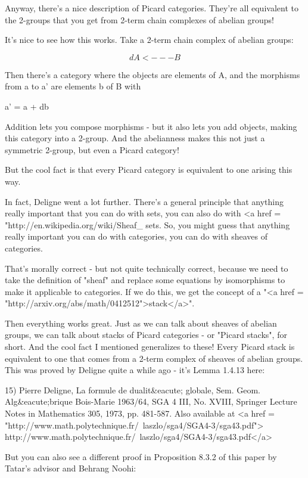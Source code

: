 Anyway, there's a nice description of Picard categories.  They're all
equivalent to the 2-groups that you get from 2-term chain complexes of
abelian groups!

It's nice to see how this works.  Take a 2-term chain complex of
abelian groups:

$$
    d
A <--- B
$$
    

Then there's a category where the objects are elements of A, and 
the morphisms from a to a' are elements b of B with 

a' = a + db

Addition lets you compose morphisms - but it also lets you add
objects, making this category into a 2-group.  And the abelianness
makes this not just a symmetric 2-group, but even a Picard category!

But the cool fact is that every Picard category is equivalent to 
one arising this way.  

In fact, Deligne went a lot further.  There's a general principle that
anything really important that you can do with sets, you can also do
with <a href =
"http://en.wikipedia.org/wiki/Sheaf_%
sets.  So, you might guess that anything really important you can do
with categories, you can do with sheaves of categories.

That's morally correct - but not quite technically correct, because we
need to take the definition of "sheaf" and replace some
equations by isomorphisms to make it applicable to categories.  If we
do this, we get the concept of a "<a href =
"http://arxiv.org/abs/math/0412512">stack</a>".

Then everything works great.  Just as we can talk about sheaves of
abelian groups, we can talk about stacks of Picard categories - or
"Picard stacks", for short.  And the cool fact I mentioned
generalizes to these!  Every Picard stack is equivalent to one that
comes from a 2-term complex of sheaves of abelian groups.  This was
proved by Deligne quite a while ago - it's Lemma 1.4.13 here:

15) Pierre Deligne, La formule de dualit&eacute; globale,
Sem. Geom. Alg&eacute;brique Bois-Marie 1963/64, SGA 4 III, No. XVIII, 
Springer Lecture Notes in Mathematics 305, 1973, pp. 481-587.
Also available at
<a href = "http://www.math.polytechnique.fr/~laszlo/sga4/SGA4-3/sga43.pdf">
http://www.math.polytechnique.fr/~laszlo/sga4/SGA4-3/sga43.pdf</a>

But you can also see a different proof in Proposition 8.3.2 of
this paper by Tatar's advisor and Behrang Noohi:

